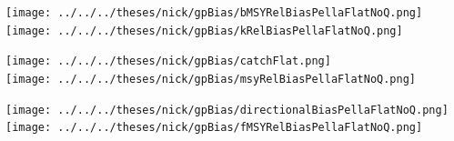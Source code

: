 \documentclass[ xcolor = pdftex, dvipsnames, table ]{beamer}
\begin{document}
\subsection{}

%
\begin{frame}%
$~$
\vspace*{-0.5cm}
\hspace*{-1.25cm}
\begin{minipage}[h!]{0.33\textwidth}
\hspace*{0.25cm}
\texttt{[image: ../../../theses/nick/gpBias/bMSYRelBiasPellaFlatNoQ.png]}\\
\hspace*{0.25cm}
\texttt{[image: ../../../theses/nick/gpBias/kRelBiasPellaFlatNoQ.png]}
\end{minipage}
\begin{minipage}[h!]{0.33\textwidth}
\hspace*{0.75cm}
\texttt{[image: ../../../theses/nick/gpBias/catchFlat.png]}\\
\hspace*{0.75cm}
\texttt{[image: ../../../theses/nick/gpBias/msyRelBiasPellaFlatNoQ.png]}
\end{minipage}
\begin{minipage}[h!]{0.33\textwidth}
\hspace*{1cm}
\texttt{[image: ../../../theses/nick/gpBias/directionalBiasPellaFlatNoQ.png]}\\
\hspace*{1cm}
\texttt{[image: ../../../theses/nick/gpBias/fMSYRelBiasPellaFlatNoQ.png]}
\end{minipage}
\end{frame}
\end{document}
